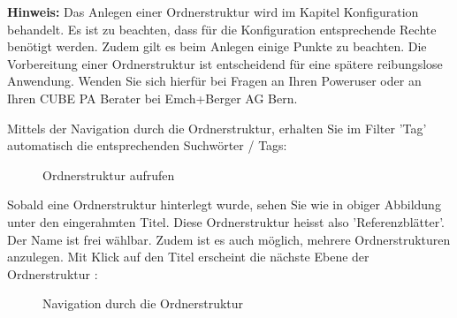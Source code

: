 \textbf{Hinweis:} Das Anlegen einer Ordnerstruktur wird im Kapitel Konfiguration behandelt. Es ist zu beachten, dass für die Konfiguration entsprechende Rechte benötigt werden. Zudem gilt es beim Anlegen einige Punkte zu beachten. Die Vorbereitung einer Ordnerstruktur ist entscheidend für eine spätere reibungslose Anwendung. Wenden Sie sich hierfür bei Fragen an Ihren Poweruser oder an Ihren CUBE PA Berater bei Emch+Berger AG Bern.

\vspace{\baselineskip}

Mittels der Navigation durch die Ordnerstruktur, erhalten Sie im Filter 'Tag' automatisch die entsprechenden Suchwörter / Tags:

\begin{figure}[H]
\caption{Ordnerstruktur aufrufen}
\end{figure}

Sobald eine Ordnerstruktur hinterlegt wurde, sehen Sie wie in obiger Abbildung unter  den eingerahmten Titel. Diese Ordnerstruktur heisst also 'Referenzblätter'. Der Name ist frei wählbar. Zudem ist es auch möglich, mehrere Ordnerstrukturen anzulegen. Mit Klick auf den Titel erscheint die nächste Ebene der Ordnerstruktur :

\begin{figure}[H]
\caption{Navigation durch die Ordnerstruktur}
\end{figure}

